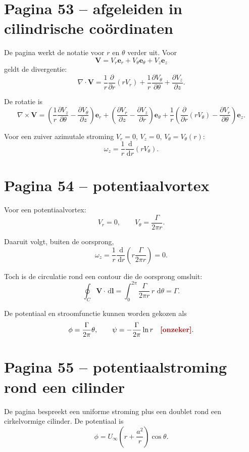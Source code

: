 \documentclass[11pt,a4paper]{article}
\newcommand{\onzeker}[1]{\ifmmode\text{\color{red!70!black}\bfseries[onzeker]}\else\textcolor{red!70!black}{\textbf{[onzeker:} #1\textbf{]}}\fi}
\newcommand{\dd}{\,\mathrm{d}}
\newcommand{\divergence}{\nabla\cdot}
\newcommand{\curl}{\nabla\times}
\newcommand{\V}{\mathbf{V}}
\begin{document}
\section*{Pagina 53 -- afgeleiden in cilindrische coördinaten}

De pagina werkt de notatie voor $r$ en $\theta$ verder uit. Voor
$$
\V
=
V_r\mathbf{e}_r
+
V_\theta\mathbf{e}_\theta
+
V_z\mathbf{e}_z
$$
geldt de divergentie:
$$
\divergence \V
=
\frac{1}{r}\frac{\partial}{\partial r}\left(rV_r\right)
+
\frac{1}{r}\frac{\partial V_\theta}{\partial \theta}
+
\frac{\partial V_z}{\partial z}.
$$

De rotatie is
$$
\curl\V
=
\left(
\frac{1}{r}\frac{\partial V_z}{\partial \theta}
-
\frac{\partial V_\theta}{\partial z}
\right)\mathbf{e}_r
+
\left(
\frac{\partial V_r}{\partial z}
-
\frac{\partial V_z}{\partial r}
\right)\mathbf{e}_\theta
+
\frac{1}{r}
\left(
\frac{\partial}{\partial r}\left(rV_\theta\right)
-
\frac{\partial V_r}{\partial \theta}
\right)\mathbf{e}_z.
$$

Voor een zuiver azimutale stroming $V_r=0$, $V_z=0$, $V_\theta=V_\theta(r)$:
$$
\omega_z
=
\frac{1}{r}
\frac{\dd}{\dd r}
\left(rV_\theta\right).
$$

\section*{Pagina 54 -- potentiaalvortex}

Voor een potentiaalvortex:
$$
V_r=0,
\qquad
V_\theta=\frac{\Gamma}{2\pi r}.
$$

Daaruit volgt, buiten de oorsprong,
$$
\omega_z
=
\frac{1}{r}\frac{\dd}{\dd r}
\left(
r\frac{\Gamma}{2\pi r}
\right)
=
0.
$$

Toch is de circulatie rond een contour die de oorsprong omsluit:
$$
\oint_C\V\cdot\dd\mathbf{l}
=
\int_0^{2\pi}
\frac{\Gamma}{2\pi r}\,r\,\dd\theta
=
\Gamma.
$$

De potentiaal en stroomfunctie kunnen worden gekozen als
$$
\phi
=
\frac{\Gamma}{2\pi}\theta,
\qquad
\psi
=
-\frac{\Gamma}{2\pi}\ln r
\quad
\onzeker{teken afhankelijk van conventie}.
$$

\section*{Pagina 55 -- potentiaalstroming rond een cilinder}

De pagina bespreekt een uniforme stroming plus een doublet rond een cirkelvormige cilinder. De potentiaal is
$$
\phi
=
U_\infty
\left(
r+\frac{a^2}{r}
\right)\cos\theta.
$$
\end{document}
